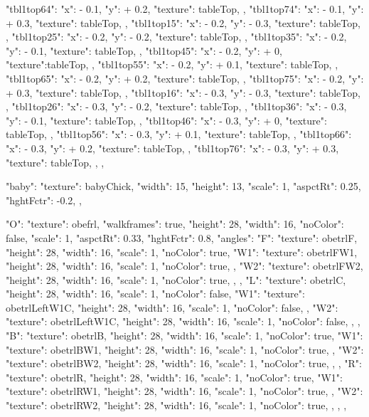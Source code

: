 {{{      "tbl1top64":{ "x": - 0.1, "y": + 0.2, "texture": tableTop, },
      "tbl1top74":{ "x": - 0.1, "y": + 0.3, "texture": tableTop, },
      "tbl1top15":{ "x": - 0.2, "y": - 0.3, "texture": tableTop, },
      "tbl1top25":{ "x": - 0.2, "y": - 0.2, "texture": tableTop, },
      "tbl1top35":{ "x": - 0.2, "y": - 0.1, "texture": tableTop, },
      "tbl1top45":{ "x": - 0.2, "y": + 0, "texture":tableTop, },
      "tbl1top55":{ "x": - 0.2, "y": + 0.1, "texture": tableTop, },
      "tbl1top65":{ "x": - 0.2, "y": + 0.2, "texture": tableTop, },
      "tbl1top75":{ "x": - 0.2, "y": + 0.3, "texture": tableTop, },
      "tbl1top16":{ "x": - 0.3, "y": - 0.3, "texture": tableTop, },
      "tbl1top26":{ "x": - 0.3, "y": - 0.2, "texture": tableTop, },
      "tbl1top36":{ "x": - 0.3, "y": - 0.1, "texture": tableTop, },
      "tbl1top46":{ "x": - 0.3, "y": + 0, "texture": tableTop, },
      "tbl1top56":{ "x": - 0.3, "y": + 0.1, "texture": tableTop, },
      "tbl1top66":{ "x": - 0.3, "y": + 0.2, "texture": tableTop, },
      "tbl1top76":{ "x": - 0.3, "y": + 0.3, "texture": tableTop, },
    }
  },


  "baby": {
    "texture": babyChick,
    "width": 15,
    "height": 13,
    "scale": 1,
    "aspctRt": 0.25,
    "hghtFctr": -0.2,
  },

  "O": {
    "texture": obefrl,
    "walkframes": true,
    "height": 28,
    "width": 16,
    "noColor": false,
    "scale": 1,
    "aspctRt": 0.33,
    "hghtFctr": 0.8,
    "angles":{
      "F": {
        "texture": obetrlF,
        "height": 28,
        "width": 16,
        "scale": 1,
        "noColor": true,
        "W1": {
          "texture": obetrlFW1,
          "height": 28,
          "width": 16,
          "scale": 1,
          "noColor": true,
        },
        "W2": {
          "texture": obetrlFW2,
          "height": 28,
          "width": 16,
          "scale": 1,
          "noColor": true,
        },
      },
      "L": {
        "texture": obetrlC,
        "height": 28,
        "width": 16,
        "scale": 1,
        "noColor": false,
        "W1": {
          "texture": obetrlLeftW1C,
          "height": 28,
          "width": 16,
          "scale": 1,
          "noColor": false,
        },
        "W2": {
          "texture": obetrlLeftW1C,
          "height": 28,
          "width": 16,
          "scale": 1,
          "noColor": false,
        },
      },
      "B": {
        "texture": obetrlB,
        "height": 28,
        "width": 16,
        "scale": 1,
        "noColor": true,
        "W1": {
          "texture": obetrlBW1,
          "height": 28,
          "width": 16,
          "scale": 1,
          "noColor": true,
        },
        "W2": {
          "texture": obetrlBW2,
          "height": 28,
          "width": 16,
          "scale": 1,
          "noColor": true,
        },
      },
      "R": {
        "texture": obetrlR,
        "height": 28,
        "width": 16,
        "scale": 1,
        "noColor": true,
        "W1": {
          "texture": obetrlRW1,
          "height": 28,
          "width": 16,
          "scale": 1,
          "noColor": true,
        },
        "W2": {
          "texture": obetrlRW2,
          "height": 28,
          "width": 16,
          "scale": 1,
          "noColor": true,
        },
      },
    }
  },

}
